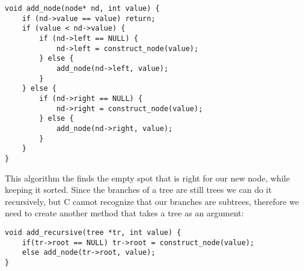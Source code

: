 \documentclass[a4paper,11pt]{article}
\begin{document}
     \begin{verbatim}
void add_node(node* nd, int value) {
    if (nd->value == value) return;
    if (value < nd->value) {
        if (nd->left == NULL) {
            nd->left = construct_node(value);
        } else {
            add_node(nd->left, value);
        }
    } else {
        if (nd->right == NULL) {
            nd->right = construct_node(value);
        } else {
            add_node(nd->right, value);
        }
    }
}
     \end{verbatim}

     This algorithm the finds the empty spot that is right for our new node, while keeping it sorted.
     Since the branches of a tree are still trees we can do it recursively, but C cannot recognize that our branches are subtrees, therefore we need to create another method that takes a tree as an argument:

     \begin{verbatim}
void add_recursive(tree *tr, int value) {
    if(tr->root == NULL) tr->root = construct_node(value);
    else add_node(tr->root, value);
}
     \end{verbatim}
\end{document}
